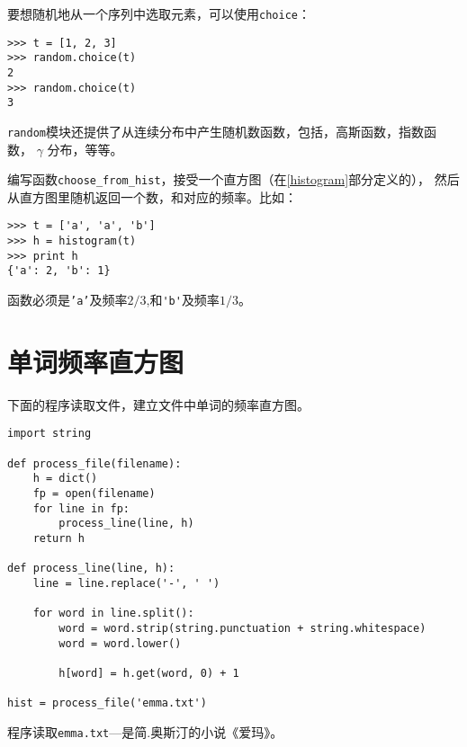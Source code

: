 要想随机地从一个序列中选取元素，可以使用{\tt choice}：


\beforeverb
\begin{verbatim}
>>> t = [1, 2, 3]
>>> random.choice(t)
2
>>> random.choice(t)
3
\end{verbatim}
\afterverb

{\tt random}模块还提供了从连续分布中产生随机数函数，包括，高斯函数，指数函数，
$\gamma$ 分布，等等。

\begin{ex}

 编写函数\verb"choose_from_hist"，接受一个直方图（在\ref{histogram}部分定义的），
 然后从直方图里随机返回一个数，和对应的频率。比如：

 \beforeverb
\begin{verbatim}
>>> t = ['a', 'a', 'b']
>>> h = histogram(t)
>>> print h
{'a': 2, 'b': 1}
\end{verbatim}
\afterverb

函数必须是{\tt 'a'}及频率$2/3$,和\verb"'b'"及频率$1/3$。

\end{ex}



\section{单词频率直方图}

下面的程序读取文件，建立文件中单词的频率直方图。


\beforeverb
\begin{verbatim}
import string

def process_file(filename):
    h = dict()
    fp = open(filename)
    for line in fp:
        process_line(line, h)
    return h

def process_line(line, h):
    line = line.replace('-', ' ')
    
    for word in line.split():
        word = word.strip(string.punctuation + string.whitespace)
        word = word.lower()

        h[word] = h.get(word, 0) + 1

hist = process_file('emma.txt')
\end{verbatim}
\afterverb
%

程序读取{\tt emma.txt}---是简.奥斯汀的小说《爱玛》。

